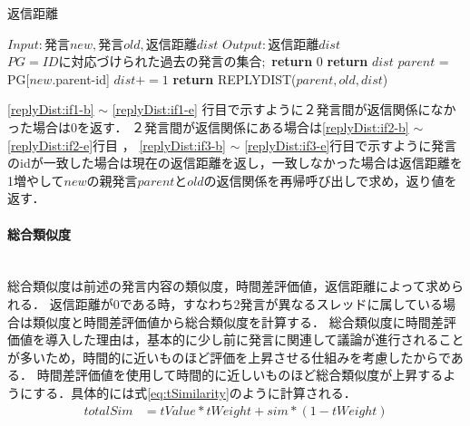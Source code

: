 \begin{algorithm}
\caption{返信距離} \label{algo:replyDist}
\begin{algorithmic}[1]
\State $Input:  発言new,発言old,返信距離dist$ 
\State $Output: 返信距離dist$
\State $PG = IDに対応づけられた過去の発言の集合;$%
	\label{replyDist:if1-b}
		\State \textbf{return} 0\label{replyDist:if1-e}
	\label{replyDist:if2-b}
		\State \textbf{return} $dist$\label{replyDist:if2-e}
	 \Else\label{replyDist:if3-b}
	 	\State $parent$ = PG[$new$.parent-id]
		\State $dist+=1$
		\State \textbf{return} REPLYDIST($parent,old,dist$)\label{replyDist:if3-e}
	\EndIf
\EndProcedure
\end{algorithmic}
\end{algorithm}

\ref{replyDist:if1-b} $\sim$ \ref{replyDist:if1-e} 行目で示すように２発言間が返信関係になかった場合は0を返す．
２発言間が返信関係にある場合は\ref{replyDist:if2-b} $\sim$ \ref{replyDist:if2-e}行目 ， \ref{replyDist:if3-b} $\sim$ \ref{replyDist:if3-e}行目で示すように発言のidが一致した場合は現在の返信距離を返し，一致しなかった場合は返信距離を1増やして$new$の親発言$parent$と$old$の返信関係を再帰呼び出しで求め，返り値を返す．

\paragraph{総合類似度}\ \\
総合類似度は前述の発言内容の類似度，時間差評価値，返信距離によって求められる．
返信距離が0である時，すなわち2発言が異なるスレッドに属している場合は類似度と時間差評価値から総合類似度を計算する．
総合類似度に時間差評価値を導入した理由は，基本的に少し前に発言に関連して議論が進行されることが多いため，時間的に近いものほど評価を上昇させる仕組みを考慮したからである．
時間差評価値を使用して時間的に近しいものほど総合類似度が上昇するようにする．具体的には式\ref{eq:tSimilarity}のように計算される．
\begin{equation}
\begin{aligned}
\label{eq:tSimilarity}
totalSim & = tValue*tWeight + sim*(1-tWeight)
\end{aligned}
\end{equation}

